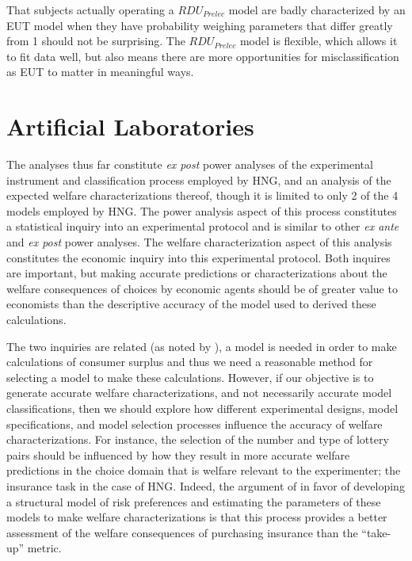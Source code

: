 \documentclass[../main.tex]{subfiles}
\begin{document}
That subjects actually operating a $\mathit{RDU_{Prelec}}$ model are badly characterized by an EUT model when they have probability weighing parameters that differ greatly from 1 should not be surprising.
The $\mathit{RDU_{Prelec}}$ model is flexible, which allows it to fit data well, but also means there are more opportunities for misclassification as EUT to matter in meaningful ways.

\section{Artificial Laboratories}

The analyses thus far constitute \textit{ex post} power analyses of the experimental instrument and classification process employed by HNG, and an analysis of the expected welfare characterizations thereof, though it is limited to only 2 of the 4 models employed by HNG.
The power analysis aspect of this process constitutes a statistical inquiry into an experimental protocol and is similar to other \textit{ex ante} and \textit{ex post} power analyses.
The welfare characterization aspect of this analysis constitutes the economic inquiry into this experimental protocol.
Both inquires are important, but making accurate predictions or characterizations about the welfare consequences of choices by economic agents should be of greater value to economists than the descriptive accuracy of the model used to derived these calculations.{\footnotemark}

\addtocounter{footnote}{-1}

The two inquiries are related (as noted by \textcite[105]{Harrison2016}), a model is needed in order to make calculations of consumer surplus and thus we need a reasonable method for selecting a model to make these calculations.
However, if our objective is to generate accurate welfare characterizations, and not necessarily accurate model classifications, then we should explore how different experimental designs, model specifications, and model selection processes influence the accuracy of welfare characterizations.
For instance, the selection of the number and type of lottery pairs should be influenced by how they result in more accurate welfare predictions in the choice domain that is welfare relevant to the experimenter; the insurance task in the case of HNG.
Indeed, the argument of \textcite{Harrison2016} in favor of developing a structural model of risk preferences and estimating the parameters of these models to make welfare characterizations is that this process provides a better assessment of the welfare consequences of purchasing insurance than the \enquote{take-up} metric. {\footnotemark}
\end{document}
